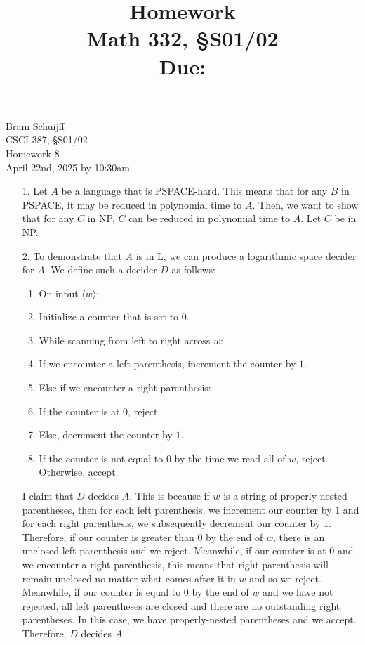 \documentclass[11pt, reqno]{amsart}
\title[Homework \HW]{Homework \HW \\
  Math 332, \S S01/02\\
\small Due: \DUE}
\author{}
\theoremstyle{plain}
\theoremstyle{definition}
\newcounter{r}
\def\tab{\hspace{10pt}}
\def\HW{8}
\def\DUE{April 22nd, 2025 by 10:30am}
\begin{document}
\begin{flushleft}
  Bram Schuijff\\
  CSCI 387, \S S01/02\\
  Homework \HW\\
  \DUE
\end{flushleft}

\begin{enumerate}
  \item[1.] Let $A$ be a language that is PSPACE-hard. This means that for any
    $B$ in PSPACE, it may be reduced in polynomial time to $A$. Then, we want
    to show that for any $C$ in NP, $C$ can be reduced in polynomial time to
    $A$. Let $C$ be in NP.
  \item[2.] To demonstrate that $A$ is in L, we can produce a logarithmic space
    decider for $A$. We define such a decider $D$ as follows:
    \begin{enumerate}[1.]
      \item On input $\langle w\rangle$:
      \item\tab Initialize a counter that is set to $0$.
      \item\tab While scanning from left to right across $w$:
      \item\tab\tab If we encounter a left parenthesis, increment the counter
        by $1$.
      \item\tab\tab Else if we encounter a right parenthesis:
      \item\tab\tab\tab If the counter is at $0$, reject.
      \item\tab\tab\tab Else, decrement the counter by $1$.
      \item\tab If the counter is not equal to $0$ by the time we read all of
        $w$, reject. Otherwise, accept.
    \end{enumerate}
    I claim that $D$ decides $A$. This is because if $w$ is a string of
    properly-nested parentheses, then for each left parenthesis, we increment
    our counter by $1$ and for each right parenthesis, we subsequently
    decrement our counter by $1$. Therefore, if our counter is greater than $0$
    by the end of $w$, there is an unclosed left parenthesis and we reject.
    Meanwhile, if our counter is at $0$ and we encounter a right parenthesis,
    this means that right parenthesis will remain unclosed no matter what comes
    after it in $w$ and so we reject. Meanwhile, if our counter is equal to $0$
    by the end of $w$ and we have not rejected, all left parentheses are closed
    and there are no outstanding right parentheses. In this case, we have
    properly-nested parentheses and we accept. Therefore, $D$ decides $A$.


\end{enumerate}
\end{document}
